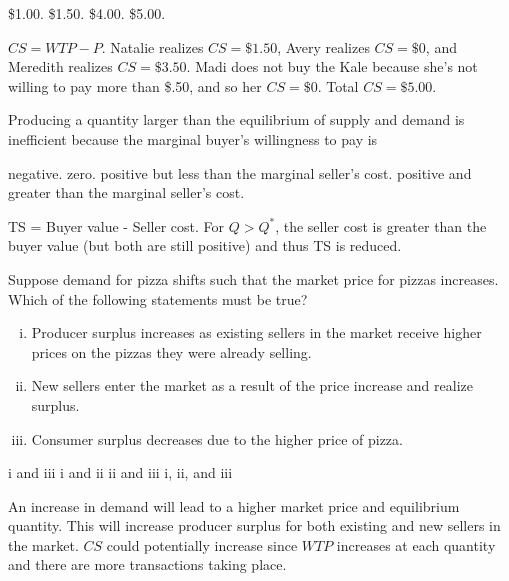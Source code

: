 \documentclass[addpoints,11pt]{exam}
\theoremstyle{definition}
\begin{document}
\begin{questions}
	\begin{choices}
		\choice \$1.00.
		\choice \$1.50.
		\choice \$4.00.
		\CorrectChoice \$5.00.
	\end{choices}
	
	\begin{solution}
		$CS = WTP - P$. Natalie realizes $CS = \$1.50$, Avery realizes $CS = \$0$, and Meredith realizes $CS = \$3.50$. Madi does not buy the Kale because she's not willing to pay more than \$.50, and so her $CS = \$0$. Total $CS = \$5.00$.
	\end{solution}
	


	
	\question Producing a quantity larger than the equilibrium of supply and demand is inefficient because the marginal buyer's willingness to pay is
	
	\begin{choices}
		\choice negative.
		\choice zero.
		\CorrectChoice positive but less than the marginal seller's cost.
		\choice positive and greater than the marginal seller's cost.
	\end{choices}
	
	\begin{solution}
		TS = Buyer value - Seller cost. For $Q>Q^*$, the seller cost is greater than the buyer value (but both are still positive) and thus TS is reduced.
	\end{solution}


	\question Suppose demand for pizza shifts such that the market price for pizzas increases. Which of the following statements must be true?
	
	\begin{enumerate}[i.]
		\item Producer surplus increases as existing sellers in the market receive higher prices on the pizzas they were already selling.
		\item New sellers enter the market as a result of the price increase and realize surplus.
		\item Consumer surplus decreases due to the higher price of pizza.
	\end{enumerate}
	
	\begin{choices}
		\choice i and iii
		\CorrectChoice i and ii
		\choice ii and iii
		\choice i, ii, and iii
	\end{choices}
	
	\begin{solution}
		An increase in demand will lead to a higher market price and equilibrium quantity. This will increase producer surplus for both existing and new sellers in the market. $CS$ could potentially increase since $WTP$ increases at each quantity and there are more transactions taking place.
	\end{solution}
	

\end{questions}
\end{document}
